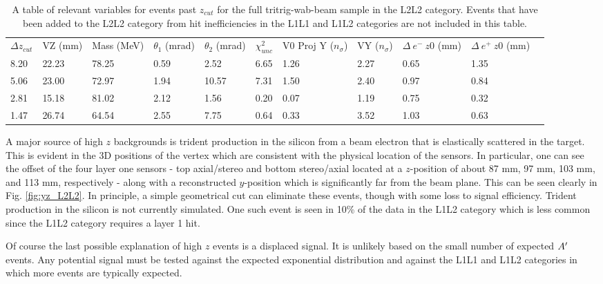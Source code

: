 \begin{table}[t]
\centering
\tabcolsep=0.09cm
\begin{tabular}{lllllllllll}

\hline

$\Delta z_{cut}$ & VZ (mm) & Mass (MeV) & $\theta_{1}$ (mrad) & $\theta_{2}$ (mrad) & $\chi^2_{unc}$ & V0 Proj Y ($n_{\sigma}$) & VY ($n_{\sigma}$) & $\Delta \ e^- \ z0$ (mm) & $\Delta \ e^+ \ z0$ (mm) \\
8.20 & 22.23 & 78.25 & 0.59 & 2.52 & 6.65 & 1.26 & 2.27 & 0.65 & 1.35 \\ 
5.06 & 23.00 & 72.97 & 1.94 & 10.57 & 7.31 & 1.50 & 2.40 & 0.97 & 0.84 \\ 
2.81 & 15.18 & 81.02 & 2.12 & 1.56 & 0.20 & 0.07 & 1.19 & 0.75 & 0.32 \\ 
1.47 & 26.74 & 64.54 & 2.55 & 7.75 & 0.64 & 0.33 & 3.52 & 1.03 & 0.63 \\

\hline

\hline
\end{tabular}
\caption{A table of relevant variables for events past $z_{cut}$ for the full tritrig-wab-beam sample in the L2L2 category. Events that have been added to the L2L2 category from hit inefficiencies in the L1L1 and L1L2 categories are not included in this table.}
\label{tab:highZ_L2L2_tritrig-wab-beam}
\end{table}

A major source of high $z$ backgrounds is trident production in the silicon from a beam electron that is elastically scattered in the target. This is evident in the 3D positions of the vertex which are consistent with the physical location of the sensors. In particular, one can see the offset of the four layer one sensors - top axial/stereo and bottom stereo/axial located at a $z$-position of about 87 mm, 97 mm, 103 mm, and 113 mm, respectively - along with a reconstructed $y$-position which is significantly far from the beam plane. This can be seen clearly in Fig. \ref{fig:yz_L2L2}. In principle, a simple geometrical cut can eliminate these events, though with some loss to signal efficiency. Trident production in the silicon is not currently simulated. One such event is seen in 10\% of the data in the L1L2 category which is less common since the L1L2 category requires a layer 1 hit.

Of course the last possible explanation of high $z$ events is a displaced signal. It is unlikely based on the small number of expected $A^\prime$ events. Any potential signal must be tested against the expected exponential distribution and against the L1L1 and L1L2 categories in which more events are typically expected.

